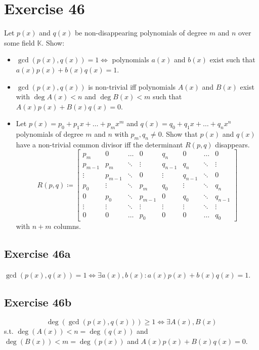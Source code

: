 \documentclass[a4paper]{article}
\theoremstyle{definition}
\begin{document}
\section{Exercise 46}
\begin{ex}
  Let $p(x)$ and $q(x)$ be non-disappearing polynomials of degree $m$ and $n$ over some field $\mathbb K$. Show:
  \begin{itemize}
    \item $\operatorname{gcd}(p(x), q(x)) = 1 \iff$ polynomials $a(x)$ and $b(x)$ exist such that $a(x) p(x) + b(x) q(x) = 1$.
    \item $\operatorname{gcd}(p(x), q(x))$ is non-trivial iff polynomials $A(x)$ and $B(x)$ exist with $\deg{A(x)} < n$ and $\deg{B(x)} < m$ such that $A(x) p(x) + B(x) q(x) = 0$.
    \item Let $p(x) = p_0 + p_1 x + \dots + p_m x^m$ and $q(x) = q_0 + q_1 x + \dots + q_n x^n$ polynomials of degree $m$ and $n$ with $p_m, q_n \neq 0$.
      Show that $p(x)$ and $q(x)$ have a non-trivial common divisor iff the determinant $R(p, q)$ disappears.
      \[
        R(p, q) \coloneqq \begin{bmatrix}
          p_m & 0 & \dots & 0 & q_n & 0 & \dots & 0 \\
          p_{m-1} & p_m & \ddots & \vdots & q_{n-1} & q_n & \ddots & \vdots \\
          \vdots & p_{m-1} & \ddots & 0 & \vdots & q_{n-1} & \ddots & 0 \\
          p_0 & \vdots & \ddots & p_m & q_0 & \vdots & \ddots & q_n \\
          0 & p_0 & \ddots & p_{m-1} & 0 & q_0 & \ddots & q_{n-1} \\
          \vdots & \vdots & \ddots & \vdots & \vdots & \vdots & \ddots & \vdots \\
          0 & 0 & \dots & p_0 & 0 & 0 & \dots & q_0
        \end{bmatrix}
      \]
      with $n + m$ columns.
  \end{itemize}
\end{ex}

\subsection{Exercise 46a}
$\operatorname{gcd}(p(x), q(x)) = 1 \iff \exists a(x), b(x): a(x) p(x) + b(x) q(x) = 1$.

\subsection{Exercise 46b}
\[ \deg(\operatorname{gcd}(p(x), q(x))) \geq 1 \iff \exists A(x), B(x) \]
s.t. $\deg(A(x)) < n = \deg(q(x))$ and $\deg(B(x)) < m = \deg(p(x))$
and $A(x) p(x) + B(x) q(x) = 0$.
\end{document}
